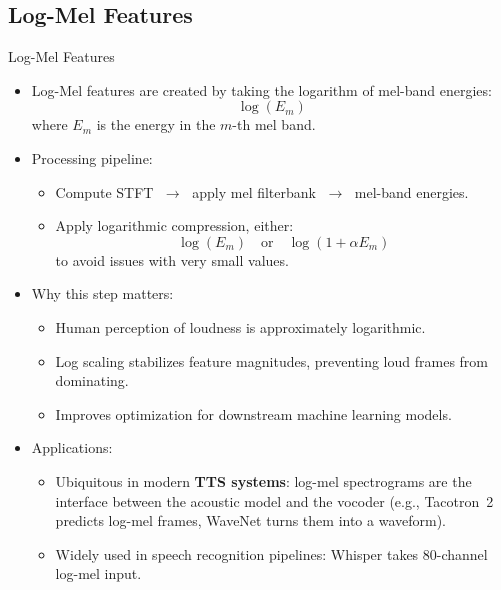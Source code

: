 \subsection{Log-Mel Features}
\begin{frame}[allowframebreaks]{Log-Mel Features}

\begin{itemize}
    \item Log-Mel features are created by taking the logarithm of mel-band energies:
    \[
        \log(E_m)
    \]
    where $E_m$ is the energy in the $m$-th mel band.

    \item Processing pipeline:
    \begin{itemize}
        \item Compute STFT $\;\rightarrow\;$ apply mel filterbank $\;\rightarrow\;$ mel-band energies.
        \item Apply logarithmic compression, either:
        \[
            \log(E_m) \quad \text{or} \quad \log(1 + \alpha E_m)
        \]
        to avoid issues with very small values.
    \end{itemize}
\framebreak
    \item Why this step matters:
    \begin{itemize}
        \item Human perception of loudness is approximately logarithmic.
        \item Log scaling stabilizes feature magnitudes, preventing loud frames from dominating.
        \item Improves optimization for downstream machine learning models.
    \end{itemize}

    \item Applications:
    \begin{itemize}
        \item Ubiquitous in modern \textbf{TTS systems}: log-mel spectrograms are the interface between the acoustic model and the vocoder (e.g., Tacotron~2 predicts log-mel frames, WaveNet turns them into a waveform).
        \item Widely used in speech recognition pipelines: Whisper takes 80-channel log-mel input.
    \end{itemize}
\end{itemize}

\end{frame}
